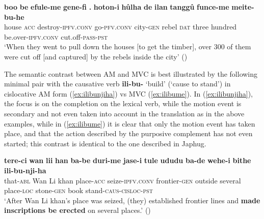 \documentclass{article}
\newcommand{\ipa}[1]{\textbf{{\phon\mbox{#1}}}} %
\begin{document}
\begin{exe}
\ex \label{ex:efuleme}
\gll
 \ipa{boo} 	\ipa{be} 	\ipa{efule-me} 	\ipa{gene-fi} 	\ipa{.} 	\ipa{hoton-i} 	\ipa{hûlha} 	\ipa{de} 	\ipa{ilan} 	\ipa{tanggû} 	\ipa{funce-me} 	\ipa{meite-bu-he} \\
 house \textsc{acc} destroy-\textsc{ipfv.conv} go-\textsc{pfv.conv} { } city-\textsc{gen} rebel \textsc{dat} three hundred be.over-\textsc{ipfv.conv} cut.off-\textsc{pass-pst} \\
 \glt ‘When they went to pull down the houses [to get the timber], over 300 of them were cut off [and captured] by the rebels inside the city’ (\citealt[69/97]{cosmo06dzengseo})
\end{exe}

 

The semantic contrast between AM and MVC is best illustrated by the following minimal pair with the causative verb \ipa{ili-bu-} `build' (`cause to stand') in cislocative AM form (\ref{ex:ilibunjiha}) vs MVC (\ref{ex:ilibume}). In (\ref{ex:ilibunjiha}), the focus is on the completion on the lexical verb, while the motion event is secondary and not even taken into account in the translation as in the above examples, while in (\ref{ex:ilibume}) it is clear that only the motion event has taken place, and that the action described by the purposive complement has not even started; this contrast is identical to the one described in Japhug.

\begin{exe}
\ex \label{ex:ilibunjiha}
\gll
\ipa{tere-ci} 	\ipa{wan} 	\ipa{lii} 	\ipa{han} 	\ipa{ba-be} 	\ipa{duri-me} 	\ipa{jase-i} 	\ipa{tule} 	\ipa{ududu} 	\ipa{ba-de} 	\ipa{wehe-i} 	\ipa{bithe} 	\ipa{ili-bu-nji-ha} \\
that-\textsc{abl} Wan Li khan place-\textsc{acc} seize-\textsc{ipfv.conv} frontier-\textsc{gen} outside several place-\textsc{loc} stone-\textsc{gen} book stand-\textsc{caus-cisloc-pst} \\
\glt ‘After Wan Li khan’s place was seized, (they) established frontier lines and \textbf{made inscriptions be erected} on several places.’ (\citealt[129-130;46]{shunjuu92yargiyan})
\end{exe}
\end{document}
